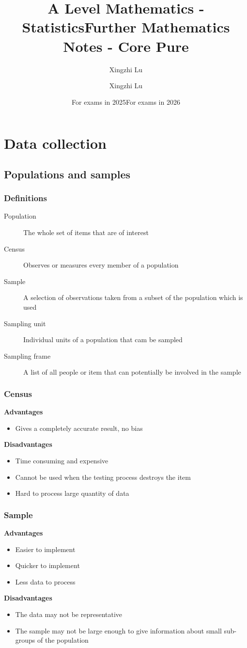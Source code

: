 \documentclass[fleqn, 11pt]{article}
\title{A Level Mathematics - Statistics}
\author{Xingzhi Lu}
\date{For exams in 2025}
\title{Further Mathematics Notes - Core Pure}
\author{Xingzhi Lu}
\date{For exams in 2026}
\begin{document}
	\maketitle
	
	\section{Data collection}
	\subsection{Populations and samples}
	\subsubsection{Definitions}
	\begin{description}
		\item[Population] The whole set of items that are of interest
		\item[Census] Observes or measures every member of a population
		\item[Sample] A selection of observations taken from a subset of the population which is used
		\item[Sampling unit] Individual units of a population that cam be sampled
		\item[Sampling frame] A list of all people or item that can potentially be involved in the sample
	\end{description}
	
	\subsubsection{Census}
	\textbf{Advantages}
	\begin{itemize}
		\item Gives a completely accurate result, no bias
	\end{itemize}
	\textbf{Disadvantages}
	\begin{itemize}
		\item Time consuming and expensive
		\item Cannot be used when the testing process destroys the item
		\item Hard to process large quantity of data
	\end{itemize}
	\subsubsection{Sample}
	\textbf{Advantages}
	\begin{itemize}
		\item Easier to implement
		\item Quicker to implement
		\item Less data to process
	\end{itemize}
	\textbf{Disadvantages}
	\begin{itemize}
		\item The data may not be representative
		\item The sample may not be large enough to give information about small sub-groups of the population
	\end{itemize}
\end{document}
